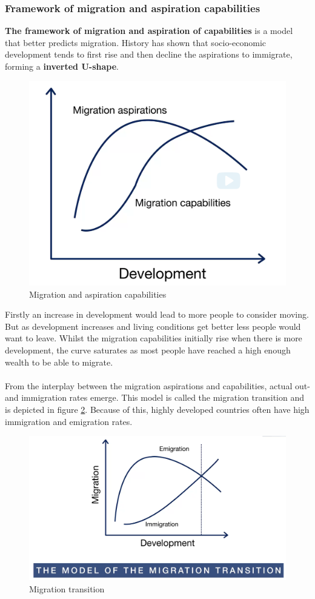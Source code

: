 \documentclass[../summary.tex]{subfiles}
\begin{document}
	\subsubsection{Framework of migration and aspiration capabilities}
	\textbf{The framework of migration and aspiration of capabilities} is a model that better predicts migration. History has shown that socio-economic development tends to first rise and then decline the aspirations to immigrate, forming a \textbf{inverted U-shape}. 
	\begin{figure}[h]
		\centering
		\includegraphics[width=0.6\linewidth]{../images/7-framework-capabilites}
		\caption{Migration and aspiration capabilities}
		\label{fig:7-framework-capabilites}
	\end{figure}
	
	Firstly an increase in development would lead to more people to consider moving. But as development increases and living conditions get better less people would want to leave. Whilst the migration capabilities initially rise when there is more development, the curve saturates as most people have reached a high enough wealth to be able to migrate. 
	\\
	\\
	From the interplay between the migration aspirations and capabilities, actual out- and immigration rates emerge. This model is called the migration transition and is depicted in figure \ref{fig:7-migration-transition}. Because of this, highly developed countries often have high immigration and emigration rates.
	\begin{figure}[h]
		\centering
		\includegraphics[width=0.7\linewidth]{../images/7-migration-transition}
		\caption{Migration transition}
		\label{fig:7-migration-transition}
	\end{figure}
	
\end{document}
